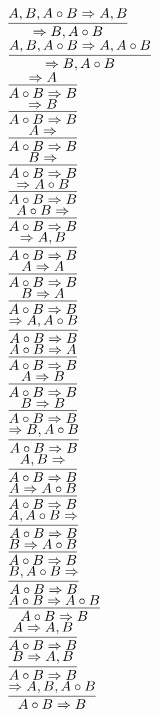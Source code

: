 \documentclass[11pt]{article}
\begin{document}
\begin{center}
\bigskip
\\$\infer{\Rightarrow B, A\circ B}{A, B, A\circ B\Rightarrow A, B}$
\bigskip
\\$\infer{\Rightarrow B, A\circ B}{A, B, A\circ B\Rightarrow A, A\circ B}$
\bigskip
\\$\infer{A\circ B\Rightarrow B}{\Rightarrow A}$
\bigskip
\\$\infer{A\circ B\Rightarrow B}{\Rightarrow B}$
\bigskip
\\$\infer{A\circ B\Rightarrow B}{A\Rightarrow }$
\bigskip
\\$\infer{A\circ B\Rightarrow B}{B\Rightarrow }$
\bigskip
\\$\infer{A\circ B\Rightarrow B}{\Rightarrow A\circ B}$
\bigskip
\\$\infer{A\circ B\Rightarrow B}{A\circ B\Rightarrow }$
\bigskip
\\$\infer{A\circ B\Rightarrow B}{\Rightarrow A, B}$
\bigskip
\\$\infer{A\circ B\Rightarrow B}{A\Rightarrow A}$
\bigskip
\\$\infer{A\circ B\Rightarrow B}{B\Rightarrow A}$
\bigskip
\\$\infer{A\circ B\Rightarrow B}{\Rightarrow A, A\circ B}$
\bigskip
\\$\infer{A\circ B\Rightarrow B}{A\circ B\Rightarrow A}$
\bigskip
\\$\infer{A\circ B\Rightarrow B}{A\Rightarrow B}$
\bigskip
\\$\infer{A\circ B\Rightarrow B}{B\Rightarrow B}$
\bigskip
\\$\infer{A\circ B\Rightarrow B}{\Rightarrow B, A\circ B}$
\bigskip
\\$\infer{A\circ B\Rightarrow B}{A, B\Rightarrow }$
\bigskip
\\$\infer{A\circ B\Rightarrow B}{A\Rightarrow A\circ B}$
\bigskip
\\$\infer{A\circ B\Rightarrow B}{A, A\circ B\Rightarrow }$
\bigskip
\\$\infer{A\circ B\Rightarrow B}{B\Rightarrow A\circ B}$
\bigskip
\\$\infer{A\circ B\Rightarrow B}{B, A\circ B\Rightarrow }$
\bigskip
\\$\infer{A\circ B\Rightarrow B}{A\circ B\Rightarrow A\circ B}$
\bigskip
\\$\infer{A\circ B\Rightarrow B}{A\Rightarrow A, B}$
\bigskip
\\$\infer{A\circ B\Rightarrow B}{B\Rightarrow A, B}$
\bigskip
\\$\infer{A\circ B\Rightarrow B}{\Rightarrow A, B, A\circ B}$

\end{center}
\end{document}
